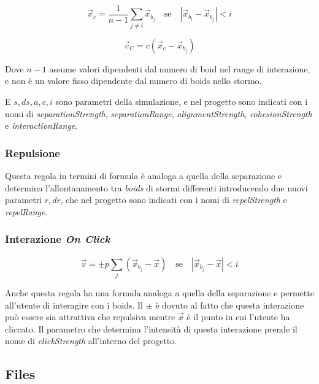\documentclass[10pt,a4paper]{article}
\begin{document}
\begin{equation*}
    \vec{x}_c = \frac{1}{n-1} \sum_{j \neq i} \vec{x}_{b_j} \quad \text{se} \quad \left| \vec{x}_{b_i} - \vec{x}_{b_j} \right| < i
\end{equation*}

\begin{equation*}
    \vec{v}_C = c (\vec{x}_{c} - \vec{x}_{b_j})
\end{equation*}

Dove $n-1$ assume valori dipendenti dal numero di boid nel range di interazione, e non è un valore fisso dipendente dal numero di boids nello stormo.

E $s, ds, a, c, i$ sono parametri della simulazione, e nel progetto sono indicati con i nomi di \textit{separationStrength}, \textit{separationRange}, \textit{alignmentStrength}, \textit{cohesionStrength} e \textit{interactionRange}.

\subsubsection{Repulsione}

Questa regola in termini di formula è analoga a quella della separazione e determina l'allontanamento tra \textit{boids} di stormi differenti introducendo due nuovi parametri $r, dr$, che nel progetto sono indicati con i nomi di \textit{repelStrength} e \textit{repelRange}.

\subsubsection{Interazione \textit{On Click}}

\begin{equation*}
    \vec{v} = \pm p \sum_{j} (\vec{x}_{b_j} - \vec{x}) \quad \text{se} \quad \left| \vec{x}_{b_j} - \vec{x} \right| < i
\end{equation*}

Anche questa regola ha una formula analoga a quella della separazione e permette all'utente di interagire con i boids. Il $\pm$ è dovuto al fatto che questa interazione può essere sia attrattiva che repulsiva mentre $\vec{x}$ è il punto in cui l'utente ha cliccato. Il parametro che determina l'intensità di questa interazione prende il nome di \textit{clickStrength} all'interno del progetto.

\newpage

\subsection{Files}
\end{document}
